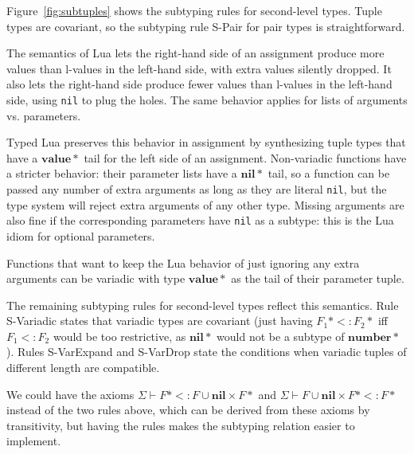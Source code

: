\documentclass[preprint]{sigplanconf}
\newcommand{\Value}{\mathbf{value}}
\newcommand{\Nil}{\mathbf{nil}}
\newcommand{\Number}{\mathbf{number}}
\newcommand{\senv}{\Sigma}
\newcommand{\subtype}{<:}
\begin{document}
Figure~\ref{fig:subtuples} shows the subtyping rules for
second-level types. 
Tuple types are covariant, so the subtyping rule {\sc S-Pair} for pair types  is straightforward.

The semantics of Lua lets the right-hand side of an assignment
produce more values than l-values in the left-hand side,
with extra values silently dropped. It also lets the
right-hand side produce fewer values than l-values in the
left-hand side, using {\tt nil} to plug the holes. The
same behavior applies for lists of arguments vs. parameters.

Typed Lua preserves this behavior in assignment by synthesizing
tuple types that have a $\Value{*}$ tail for the left side
of an assignment. Non-variadic functions have a stricter
behavior: their parameter lists have a $\Nil{*}$ tail, so
a function can be passed any number of extra arguments
as long as they are literal {\tt nil}, but the type system will
reject extra arguments of any other type. Missing arguments
are also fine if the corresponding parameters have {\tt nil}
as a subtype: this is the Lua idiom for optional parameters.

Functions that want to keep the Lua behavior of just ignoring
any extra arguments can be variadic with type $\Value{*}$ as
the tail of their parameter tuple.

The remaining subtyping rules for second-level types
reflect this semantics. Rule {\sc S-Variadic} states
that variadic types are covariant (just having $F_1{*} \subtype F_2{*}$ iff $F_1 \subtype F_2$ would be too restrictive,
as $\Nil{*}$ would not be a subtype of $\Number{*}$).
Rules {\sc S-VarExpand} and {\sc S-VarDrop} state the
conditions when variadic tuples of different length are
compatible.

We could have the axioms $\senv \vdash F{*} \subtype F \cup \Nil \times F{*}$ and $\senv \vdash F \cup \Nil \times F{*}  \subtype F{*}$ instead of the two rules above, which can be derived
from these axioms by transitivity, but having the rules makes
the subtyping relation easier to implement.
\end{document}
